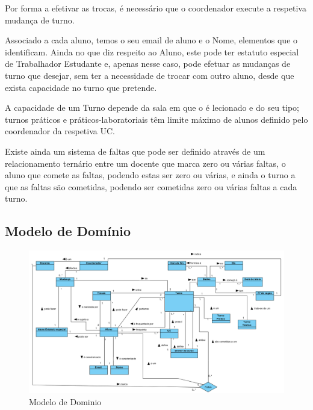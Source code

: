 \documentclass[12pt,a4paper]{report}
\begin{document}
Por forma a efetivar as trocas, é necessário que o coordenador execute a respetiva
mudança de turno.

Associado a cada aluno, temos o seu email de aluno e o Nome, elementos que o identificam. Ainda
no que diz respeito ao Aluno, este pode ter estatuto especial de Trabalhador Estudante e, apenas nesse caso, pode
efetuar as mudanças de turno que desejar, sem ter a necessidade de trocar com outro
aluno, desde que exista capacidade no turno que pretende. 

A capacidade de um Turno depende da
sala em que o é lecionado e do seu tipo; turnos práticos e práticos-laboratoriais têm limite máximo de alunos definido pelo coordenador da respetiva UC.

Existe ainda um sistema de faltas que pode ser definido através de um relacionamento ternário entre um docente que marca zero ou várias faltas, o aluno que comete as faltas, podendo estas ser zero ou várias, e ainda o turno a que as faltas são cometidas, podendo ser cometidas zero ou várias faltas a cada turno.


\begin{landscape}
\section{Modelo de Domínio}
\begin{figure}[H]
	\centering 
	\includegraphics[width=1.3\textwidth]{modelacao/modelo_dominio.png}  
	\caption{Modelo de Dominio}
\end{figure}
\vfill
\thispagestyle{empty}
\raisebox{}{\makebox[\linewidth]{\thepage}}
\end{landscape}
\end{document}

